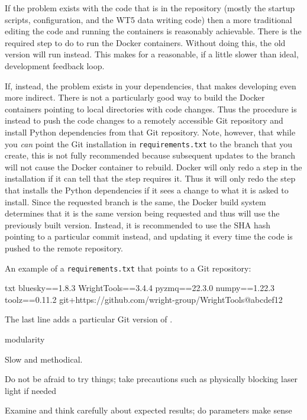 If the problem exists with the code that is in the \biab repository (mostly the startup scripts, configuration, and the WT5 data writing code) then a more traditional editing the code and running the containers is reasonably achievable.
There is the required step to do  to run the Docker containers.
Without doing this, the old version will run instead.
This makes for a reasonable, if a little slower than ideal, development feedback loop.

If, instead, the problem exists in your dependencies, that makes developing even more indirect.
There is not a particularly good way to build the Docker containers pointing to local directories with code changes.
Thus the procedure is instead to push the code changes to a remotely accessible Git repository and install Python dependencies from that Git repository.
Note, however, that while you \textit{can} point the Git installation in \texttt{requirements.txt} to the branch that you create, this is not fully recommended because subsequent updates to the branch will not cause the Docker container to rebuild.
Docker will only redo a step in the installation if it can tell that the step requires it.
Thus it will only redo the step that installs the Python dependencies if it sees a change to what it is asked to install.
Since the requested branch is the same, the Docker build system determines that it is the same version being requested and thus will use the previously built version.
Instead, it is recommended to use the SHA hash pointing to a particular commit instead, and updating it every time the code is pushed to the remote repository.

An example of a \texttt{requirements.txt} that points to a Git repository:

\begin{codefragment}{txt}
bluesky==1.8.3
WrightTools==3.4.4
pyzmq==22.3.0
numpy==1.22.3
toolz==0.11.2
git+https://github.com/wright-group/WrightTools@abcdef12
\end{codefragment}

The last line adds a particular Git version of \wrighttools.


modularity

Slow and methodical.

Do not be afraid to try things; take precautions such as physically blocking laser light if needed

Examine and think carefully about expected results; do parameters make sense


